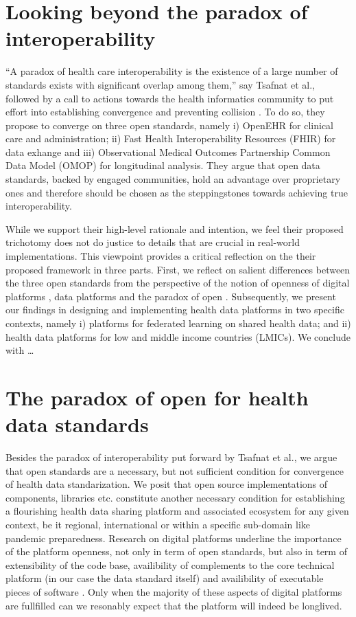 \documentclass[
  authoryear]{elsarticle}
\begin{document}
\section{Looking beyond the paradox of
interoperability}\label{looking-beyond-the-paradox-of-interoperability}

``A paradox of health care interoperability is the existence of a large
number of standards exists with significant overlap among them,'' say
Tsafnat et al., followed by a call to actions towards the health
informatics community to put effort into establishing convergence and
preventing collision \citep{tsafnat2024converge}. To do so, they propose
to converge on three open standards, namely i) OpenEHR for clinical care
and administration; ii) Fast Health Interoperability Resources (FHIR)
for data exhange and iii) Observational Medical Outcomes Partnership
Common Data Model (OMOP) for longitudinal analysis. They argue that open
data standards, backed by engaged communities, hold an advantage over
proprietary ones and therefore should be chosen as the steppingstones
towards achieving true interoperability.

While we support their high-level rationale and intention, we feel their
proposed trichotomy does not do justice to details that are crucial in
real-world implementations. This viewpoint provides a critical
reflection on the their proposed framework in three parts. First, we
reflect on salient differences between the three open standards from the
perspective of the notion of openness of digital platforms
\citep{dereuver2018digital}, data platforms \citep{dereuver2022openness}
and the paradox of open \citep{keller2021paradox}. Subsequently, we
present our findings in designing and implementing health data platforms
in two specific contexts, namely i) platforms for federated learning on
shared health data; and ii) health data platforms for low and middle
income countries (LMICs). We conclude with \ldots{}

\section{The paradox of open for health data
standards}\label{the-paradox-of-open-for-health-data-standards}

Besides the paradox of interoperability put forward by Tsafnat et al.,
we argue that open standards are a necessary, but not sufficient
condition for convergence of health data standarization. We posit that
open source implementations of components, libraries etc. constitute
another necessary condition for establishing a flourishing health data
sharing platform and associated ecosystem for any given context, be it
regional, international or within a specific sub-domain like pandemic
preparedness. Research on digital platforms underline the importance of
the platform openness, not only in term of open standards, but also in
term of extensibility of the code base, availibility of complements to
the core technical platform (in our case the data standard itself) and
availibility of executable pieces of software
\citep{dereuver2018digital}. Only when the majority of these aspects of
digital platforms are fullfilled can we resonably expect that the
platform will indeed be longlived.
\end{document}

